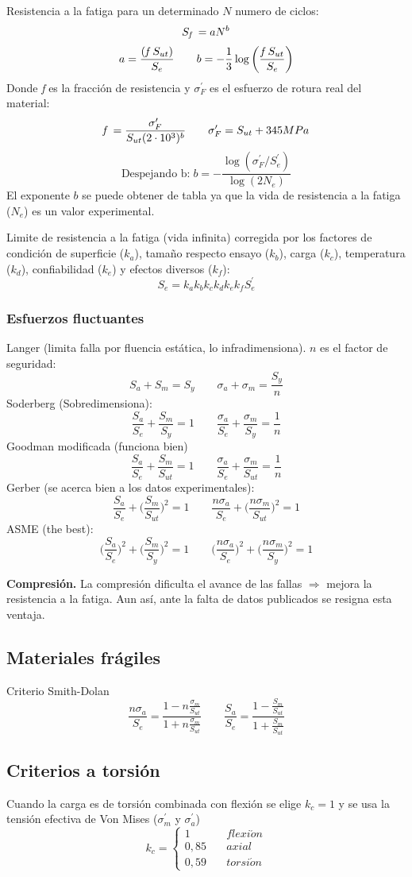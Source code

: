 \documentclass[twocolumn,10pt]{article}
\newcommand{\bigpar}[1]{\bigg(
#1 \bigg) }
\newcommand{\fit}{\textit{\textrm{f }}}
\begin{document}
Resistencia a la fatiga para un determinado $N$ numero de ciclos:
$$ S_\fit=aN^b $$
$$a=\frac{(\fit S_{ut})}{S_e} \qquad b=-\frac{1}{3}\log\bigpar{\frac{\fit S_{ut}}{S_e}} $$
Donde \fit es la fracción de resistencia y $\sigma_F^\prime $ es el esfuerzo de rotura real del material:
$$\fit = \frac{\sigma_F^\prime}{S_{ut}(2\cdot 10^3)^b} \qquad \sigma_F^\prime=S_{ut}+345MPa$$
$$\text{Despejando b:}\;  b=-\frac{\log (\sigma_F^\prime/S_e^\prime)}{\log(2N_e)}$$
El exponente $b$ se puede obtener de tabla ya que la vida de resistencia a la fatiga ($N_e$) es un valor experimental.\par
Limite de resistencia a la fatiga (vida infinita) corregida por los factores de condición de superficie ($k_a$), tamaño respecto ensayo ($k_b$), carga ($k_c$), temperatura ($k_d$), confiabilidad ($k_e$) y efectos diversos ($k_f$):
$$ S_e=k_a k_b k_c k_d k_e k_f S_e^\prime $$
\subsubsection{Esfuerzos fluctuantes}
Langer (limita falla por fluencia estática, lo infradimensiona). $n$ es el factor de seguridad:
$$S_a+S_m=S_y\qquad \sigma_a+\sigma_m=\frac{S_y}{n}$$
Soderberg (Sobredimensiona):
$$\frac{S_a}{S_e}+\frac{S_m}{S_y}=1\qquad \frac{\sigma_a}{S_e}+\frac{\sigma_m}{S_y}=\frac{1}{n}$$
Goodman modificada (funciona bien)
$$\frac{S_a}{S_e}+\frac{S_m}{S_{ut}}=1  \qquad \frac{\sigma_a}{S_e}+\frac{\sigma_m}{S_{ut}}=\frac{1}{n}$$
Gerber (se acerca bien a los datos experimentales):
$$ \frac{S_a}{S_e} + \bigg( \frac{S_m}{S_{ut}} \bigg)^2 =1 \qquad  \frac{n\sigma_a}{S_e}+\bigpar{\frac{n\sigma_m}{S_{ut}}}^2 =1 $$
ASME (the best):
$$ \bigpar{\frac{S_a}{S_e}}^2+\bigpar{\frac{S_m}{S_y}}^2=1 \qquad \bigpar{\frac{n\sigma_a}{S_e}}^2+\bigpar{\frac{n\sigma_m}{S_y}}^2=1$$

\textbf{Compresión.} La compresión dificulta el avance de las fallas  $\Rightarrow$  mejora la resistencia a la fatiga. Aun así, ante la falta de datos publicados se resigna esta ventaja.
\subsection{Materiales frágiles}
Criterio Smith-Dolan
$$ \frac{n\sigma_a}{S_e}=\frac{1-n\frac{\sigma_m}{S_{ut}}}{1+n\frac{\sigma_m}{S_{ut}}} \qquad \frac{S_a}{S_e}=\frac{1-\frac{S_m}{S_{ut}}}{1+\frac{S_m}{S_{ut}}}$$
\subsection{Criterios a torsión}
Cuando la carga es de torsión combinada con flexión se elige $k_c=1$ y se usa la tensión efectiva de Von Mises ($\sigma_m^\prime$ y $\sigma_a^\prime$) %
\[ k_c =
  \begin{cases}
    1       & \quad flexi\acute{o}n\\
    0,85    & \quad axial \\
    0,59      &\quad torsi\acute{o}n
  \end{cases}
\]
\end{document}
